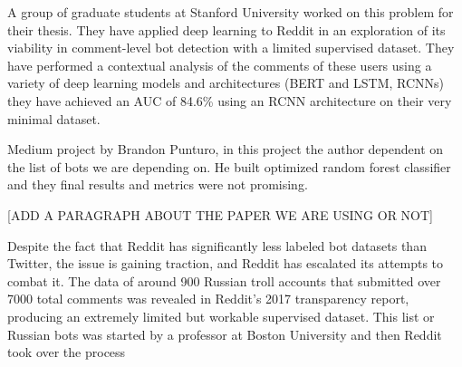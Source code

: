 \documentclass{article}
\begin{document}
     A group of graduate students at Stanford University worked on this problem for their thesis. They have applied deep learning to Reddit in an exploration of its viability in comment-level bot detection with a limited supervised dataset. They have performed a contextual analysis of the comments of these users using a variety of deep learning models and architectures (BERT and LSTM, RCNNs) they have achieved an AUC of 84.6\% using an RCNN architecture on their very minimal dataset.\par
     
     Medium project by Brandon Punturo, in this project the author dependent on the list of bots we are depending on. He built optimized random forest classifier and they final results and metrics were not promising.\par
     
     [ADD A PARAGRAPH ABOUT THE PAPER WE ARE USING OR NOT]
     
     Despite the fact that Reddit has significantly less labeled bot datasets than Twitter, the issue is gaining traction, and Reddit has escalated its attempts to combat it. The data of around 900 Russian troll accounts that submitted over 7000 total comments was revealed in Reddit's 2017 transparency report, producing an extremely limited but workable supervised dataset. This list or Russian bots was started by a professor at Boston University and then Reddit took over the process \par
     
     
     

    
\end{document}
